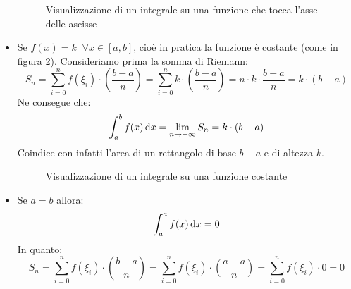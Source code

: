 \begin{itemize}
\begin{figure}[h]
\begin{center}
			\end{center}
			\caption{Visualizzazione di un integrale su una funzione che tocca l'asse delle ascisse}
			\label{fig_sottografico_pos_zero}
		\end{figure}

	\item Se $f(x) = k \;\; \forall x \in [a,b]$, cioè in pratica la funzione è costante (come in figura \ref{fig_sottografico_rettangolo}). Consideriamo prima la somma di Riemann: 
		\begin{equation*}
			S_n = \sum \limits_{i = 0}^n f(\xi_i) \cdot \left(\dfrac{b-a}{n}\right) = \sum \limits_{i = 0}^n k \cdot \left(\dfrac{b-a}{n}\right) = n \cdot k \cdot \dfrac{b-a}{n} = k \cdot (b-a)
		\end{equation*}
		Ne consegue che:
		\begin{equation*}
			\int_a^b f(x) \,\text{d} x = \lim_{n \to +\infty} S_n = k \cdot (b-a)
		\end{equation*}
		Coindice con infatti l'area di un rettangolo di base $b-a$ e di altezza $k$.


		\begin{figure}[h]
			\begin{center}


			\end{center}
			\caption{Visualizzazione di un integrale su una funzione costante}
			\label{fig_sottografico_rettangolo}
		\end{figure}
	
	\item Se $a = b$ allora:
		\begin{equation*}
			\int_a^a f(x) \,\text{d} x = 0
		\end{equation*}
		In quanto:
		\begin{equation*}
			S_n = \sum \limits_{i = 0}^n f(\xi_i) \cdot \left(\dfrac{b-a}{n}\right) = \sum \limits_{i = 0}^n f(\xi_i) \cdot \left(\dfrac{a-a}{n}\right) = \sum \limits_{i = 0}^n f(\xi_i) \cdot 0 = 0
		\end{equation*}
\end{itemize}

